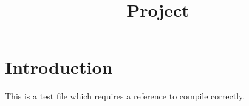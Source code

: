 


%


\title{Project}


\maketitle

\label{section-phantom}

\tableofcontents

\section{Introduction}
\label{section-introduction}

This is a test file which requires a reference to compile correctly. \cite{Maclane}







